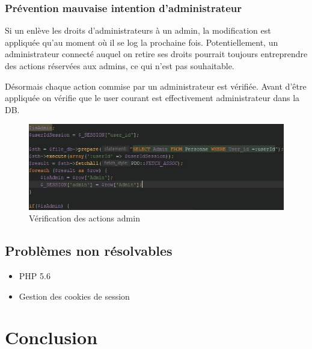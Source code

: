 \documentclass[12pt]{article}
\begin{document}
\subsubsection{Prévention mauvaise intention d'administrateur}
Si un enlève les droits d'administrateurs à un admin, la modification est appliquée qu'au moment où il se log la prochaine fois. Potentiellement, un administrateur connecté auquel on retire ses droits pourrait toujours entreprendre des actions réservées aux admins, ce qui n'est pas souhaitable.

Désormais chaque action commise par un administrateur est vérifiée. Avant d'être appliquée on vérifie que le user courant est effectivement administrateur dans la DB.

\begin{figure}[H]
\centering
\includegraphics[width=\linewidth]{images/ifSupressAdmin.jpg}
\caption{Vérification des actions admin}
\end{figure}
\subsection{Problèmes non résolvables}
\begin{itemize}
\item PHP 5.6
\item Gestion des cookies de session
\end{itemize}

\section{Conclusion}
\end{document}
